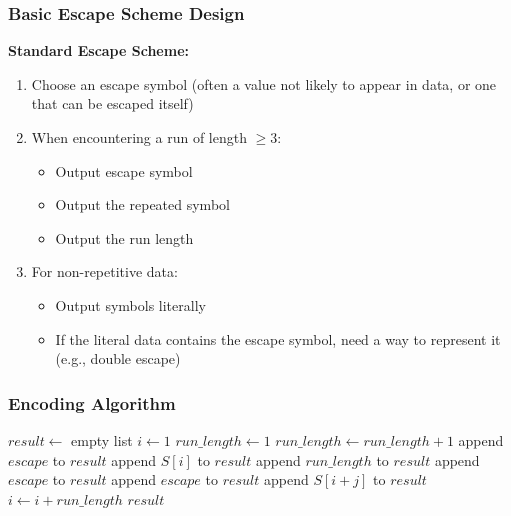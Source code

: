 \subsubsection{Basic Escape Scheme Design}

\begin{importantbox}
\textbf{Standard Escape Scheme:}

\begin{enumerate}
    \item Choose an escape symbol (often a value not likely to appear in data, or one that can be escaped itself)
    \item When encountering a run of length $\geq 3$:
    \begin{itemize}
        \item Output escape symbol
        \item Output the repeated symbol
        \item Output the run length
    \end{itemize}
    \item For non-repetitive data:
    \begin{itemize}
        \item Output symbols literally
        \item If the literal data contains the escape symbol, need a way to represent it (e.g., double escape)
    \end{itemize}
\end{enumerate}
\end{importantbox}

\subsubsection{Encoding Algorithm}

\begin{algorithm}[H]
\caption{Escape-Based RLE Encoding (Threshold T=3)}
\begin{algorithmic}[1]
    \State $result \gets$ empty list
    \State $i \gets 1$
        \State $run\_length \gets 1$
            \State $run\_length \gets run\_length + 1$
        \EndWhile
         
            \State append $escape$ to $result$
            \State append $S[i]$ to $result$
            \State append $run\_length$ to $result$
        \Else {}
                    \State append $escape$ to $result$ 
                    \State append $escape$ to $result$
                \Else
                    \State append $S[i+j]$ to $result$
                \EndIf
            \EndFor
        \EndIf
        \State $i \gets i + run\_length$
    \EndWhile
    \State \Return $result$
\EndProcedure
\end{algorithmic}
\end{algorithm}

